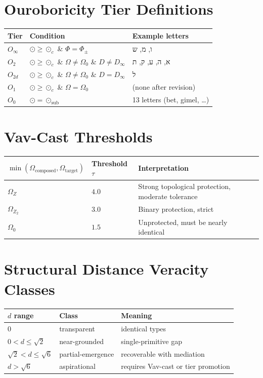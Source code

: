 \documentclass[10pt,a4paper]{article}
\newcommand{\heb}[1]{{\hebrewfont #1}}
\begin{document}
\section*{Ouroboricity Tier Definitions}

\begin{tabular}{ @{} l l l @{}}
\toprule
Tier & Condition & Example letters \\
\midrule
$O_\infty$ & $\odot \ge \odot_c$ \& $\Phi = \Phi_{\pm}$ & \heb{ו}, \heb{מ}, \heb{ש} \\
$O_2$      & $\odot \ge \odot_c$ \& $\Omega \neq \Omega_0$ \& $D \neq D_\infty$ & \heb{א}, \heb{ה}, \heb{ע}, \heb{ק}, \heb{ת} \\
$O_{2d}$   & $\odot \ge \odot_c$ \& $\Omega \neq \Omega_0$ \& $D = D_\infty$ & \heb{ל} \\
$O_1$      & $\odot \ge \odot_c$ \& $\Omega = \Omega_0$ & (none after revision) \\
$O_0$      & $\odot = \odot_{\text{sub}}$ & 13 letters (bet, gimel, \ldots) \\
\bottomrule
\end{tabular}

\section*{Vav-Cast Thresholds}

\begin{tabular}{ @{} l l l @{}}
\toprule
$\min(\Omega_{\text{composed}}, \Omega_{\text{target}})$ & Threshold $\tau$ & Interpretation \\
\midrule
$\Omega_Z$   & $4.0$ & Strong topological protection, moderate tolerance \\
$\Omega_{Z_2}$ & $3.0$ & Binary protection, strict \\
$\Omega_0$   & $1.5$ & Unprotected, must be nearly identical \\
\bottomrule
\end{tabular}

\section*{Structural Distance Veracity Classes}

\begin{tabular}{ @{} l l l @{}}
\toprule
$d$ range & Class & Meaning \\
\midrule
$0$            & transparent & identical types \\
$0 < d \le \sqrt{2}$ & near-grounded & single-primitive gap \\
$\sqrt{2} < d \le \sqrt{6}$ & partial-emergence & recoverable with mediation \\
$d > \sqrt{6}$ & aspirational & requires Vav-cast or tier promotion \\
\bottomrule
\end{tabular}
\end{document}
